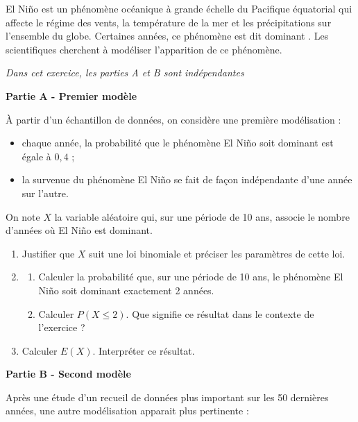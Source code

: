 \medskip

El Niño est un phénomène océanique à grande échelle du Pacifique équatorial qui affecte le régime des vents, la température de la mer et les précipitations sur l’ensemble du globe. Certaines années, ce phénomène est dit \og dominant \fg. Les scientifiques cherchent à modéliser l’apparition de ce phénomène.

\begin{center}\emph{Dans cet exercice, les parties A et B sont indépendantes}\end{center}

\medskip

\textbf{Partie A - Premier modèle}

\medskip

À partir d’un échantillon de données, on considère une première modélisation :

\begin{itemize}
\item chaque année, la probabilité que le phénomène El Niño soit dominant est égale à $0,4$ ;
\item la survenue du phénomène El Niño se fait de façon indépendante d’une année sur
l’autre.
\end{itemize}

On note $X$ la variable aléatoire qui, sur une période de 10 ans, associe le nombre d’années où El Niño est dominant.

\medskip

\begin{enumerate}
\item Justifier que $X$ suit une loi binomiale et préciser les paramètres de cette loi.
\item 
	\begin{enumerate}
		\item Calculer la probabilité que, sur une période de 10 ans, le phénomène El Niño soit dominant exactement 2 années.
		\item Calculer $P(X \leqslant 2)$. Que signifie ce résultat dans le contexte de l’exercice ?
	\end{enumerate}
\item Calculer $E(X)$. Interpréter ce résultat.
\end{enumerate}

\medskip

\textbf{Partie B - Second modèle}

\medskip

Après une étude d’un recueil de données plus important sur les 50 dernières années, une autre modélisation apparait plus pertinente :

